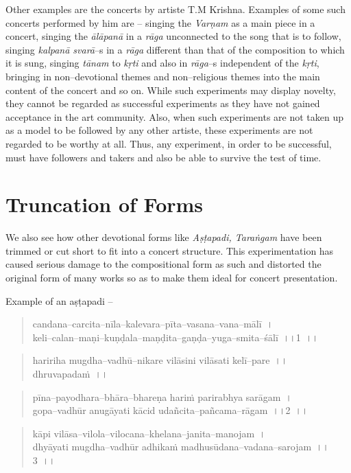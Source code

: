 Other examples are the concerts by artiste T.M Krishna. Examples of some such concerts performed by him are – singing the \textit{Varṇam} as a main piece in a concert, singing the \textit{ālāpanā} in a \textit{rāga} unconnected to the song that is to follow, singing \textit{kalpanā svarā}–s in a \textit{rāga} different than that of the composition to which it is sung, singing \textit{tānam} to \textit{kṛti} and also in \textit{rāga}–s independent of the \textit{kṛti}, bringing in non–devotional themes and non–religious themes into the main content of the concert and so on. While such experiments may display novelty, they cannot be regarded as successful experiments as they have not gained acceptance in the art community. Also, when such experiments are not taken up as a model to be followed by any other artiste, these experiments are not regarded to be worthy at all. Thus, any experiment, in order to be successful, must have followers and takers and also be able to survive the test of time.


\section*{Truncation of Forms}

We also see how other devotional forms like \textit{Aṣṭapadi, Taraṅgam} have been trimmed or cut short to fit into a concert structure. This experimentation has caused serious damage to the compositional form as such and distorted the original form of many works so as to make them ideal for concert presentation.

Example of an aṣṭapadi –

\begin{verse}
candana–carcita–nīla–kalevara–pīta–vasana–vana–mālī~।\\ keli–calan–maṇi–kuṇḍala–maṇḍita–gaṇḍa–yuga–smita–śālī~।।1~।।
\end{verse}

\begin{verse}
haririha mugdha–vadhū–nikare vilāsini vilāsati kelī–pare~।।dhruvapadaṁ~।।
\end{verse}

\begin{verse}
pīna–payodhara–bhāra–bhareṇa hariṁ parirabhya sarāgam~।\\ gopa–vadhūr anugāyati kācid udañcita–pañcama–rāgam~।।2~।।
\end{verse}

\begin{verse}
kāpi vilāsa–vilola–vilocana–khelana–janita–manojam~।\\ dhyāyati mugdha–vadhūr adhikaṁ madhusūdana–vadana–sarojam~।।3~।।
\end{verse}

